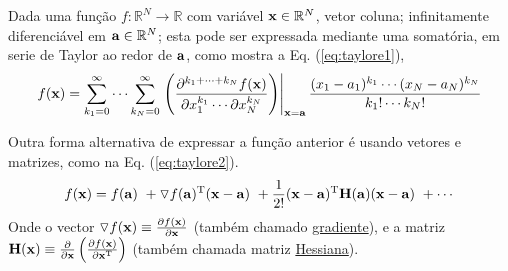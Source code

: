 \begin{proposition}\label{prop:taylore}
Dada uma função $f:\mathbb{R}^{N}\rightarrow \mathbb{R}$ com variável $\VECTOR{x} \in \mathbb{R}^{N}$, vetor coluna;
infinitamente diferenciável em $\VECTOR{a} \in \mathbb{R}^{N}$;
esta pode ser expressada mediante uma somatória, em serie de Taylor 
\cite[pp. 187, 207]{zhang2017matrix} \cite{Taylor}  ao redor de $\VECTOR{a}$, como
mostra a Eq. (\ref{eq:taylore1}),
\begin{equation}\label{eq:taylore1}
f(\VECTOR{x}) =\sum _{k_{1}=0}^{\infty }\cdots \sum _{k_{N}=0}^{\infty }\left.\left({\frac {\partial ^{k_{1}+\cdots +k_{N}}f(\VECTOR{x})}{\partial x_{1}^{k_{1}}\cdots \partial x_{N}^{k_{N}}}}\right)\right|_{\VECTOR{x}=\VECTOR{a}} {\frac {(x_{1}-a_{1})^{k_{1}}\cdots (x_{N}-a_{N})^{k_{N}}}{k_{1}!\cdots k_{N}!}}
\end{equation}

Outra forma alternativa de expressar a função anterior é usando vetores e matrizes,
como na Eq. (\ref{eq:taylore2}).
\begin{equation}\label{eq:taylore2}
  f(\VECTOR{x})=f(\VECTOR{a})
      ~+ \triangledown f(\VECTOR{a})^{\transpose} (\VECTOR{x}-\VECTOR{a})
      ~+\frac{1}{2!}(\VECTOR{x}-\VECTOR{a})^{\transpose} \MATRIX{H(\VECTOR{a})}  (\VECTOR{x}-\VECTOR{a})
      ~+\cdots 
\end{equation}
Onde o vector $\triangledown f(\VECTOR{x})\equiv \frac{\partial f(\VECTOR{x})}{\partial \VECTOR{x} }$ 
(também chamado \hyperref[def:gradient]{gradiente}),
e a matriz $\MATRIX{H}(\VECTOR{x})\equiv \frac{\partial }{\partial \VECTOR{x}} \left( \frac{\partial f(\VECTOR{x})}{ \partial \VECTOR{x}^{\transpose} }\right)$
(também chamada matriz \hyperref[def:hessian]{Hessiana}).
\end{proposition}


